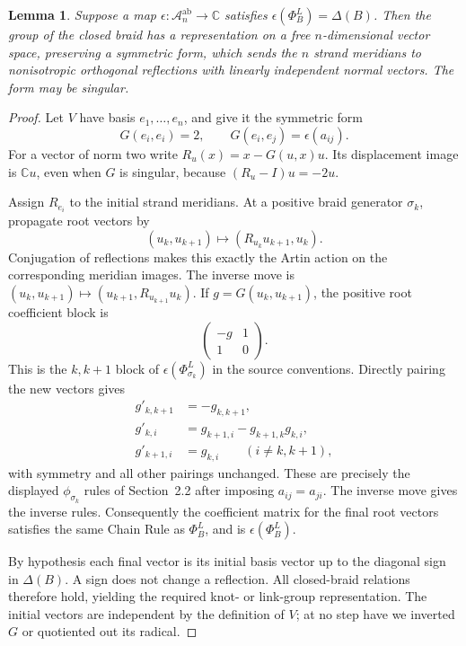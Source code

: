 \documentclass[11pt]{article}
\newtheorem{lemma}{Lemma}
\newcommand{\C}{\mathbb C}
\begin{document}
\begin{lemma}\label{lem:transport}
Suppose a map $\epsilon:\mathcal A_n^{\mathrm{ab}}\to\C$
satisfies $\epsilon(\Phi_B^L)=\Delta(B)$.
Then the group of the closed braid has a representation on a free
$n$-dimensional vector space, preserving a symmetric form, which
sends the $n$ strand meridians to nonisotropic orthogonal reflections
with linearly independent normal vectors. The form may be singular.
\end{lemma}
\begin{proof}
Let $V$ have basis $e_1,\ldots,e_n$, and give it the symmetric form
\[
 G(e_i,e_i)=2,\qquad G(e_i,e_j)=\epsilon(a_{ij}).
\]
For a vector of norm two write $R_u(x)=x-G(u,x)u$.
Its displacement image is $\C u$, even when $G$ is singular,
because $(R_u-I)u=-2u$.

Assign $R_{e_i}$ to the initial strand meridians. At a positive
braid generator $\sigma_k$, propagate root vectors by
\[
 (u_k,u_{k+1})\longmapsto
       (R_{u_k}u_{k+1},u_k).
\]
Conjugation of reflections makes this exactly the Artin action
on the corresponding meridian images. The inverse move is
$(u_k,u_{k+1})\mapsto(u_{k+1},R_{u_{k+1}}u_k)$.
If $g=G(u_k,u_{k+1})$, the positive root coefficient block is
\[
                 \begin{pmatrix}-g&1\\1&0\end{pmatrix}.
\]
This is the $k,k+1$ block of $\epsilon(\Phi_{\sigma_k}^L)$
in the source conventions. Directly pairing the new vectors gives
\[
 \begin{split}
  g'_{k,k+1}&=-g_{k,k+1},\\
  g'_{k,i}&=g_{k+1,i}-g_{k+1,k}g_{k,i},\\
  g'_{k+1,i}&=g_{k,i}\qquad(i\ne k,k+1),
 \end{split}
\]
with symmetry and all other pairings unchanged. These are precisely
the displayed $\phi_{\sigma_k}$ rules of Section~2.2 after imposing
$a_{ij}=a_{ji}$. The inverse move gives the inverse rules.
Consequently the coefficient matrix for the final root vectors
satisfies the same Chain Rule as $\Phi_B^L$, and is
$\epsilon(\Phi_B^L)$.

By hypothesis each final vector is its initial basis vector up
to the diagonal sign in $\Delta(B)$. A sign does not change a
reflection. All closed-braid relations therefore hold, yielding
the required knot- or link-group representation.
The initial vectors are independent by the definition of $V$;
at no step have we inverted $G$ or quotiented out its radical.
\end{proof}
\end{document}
